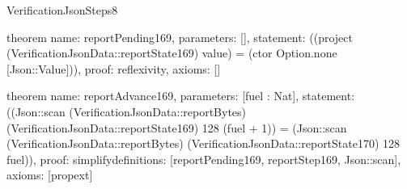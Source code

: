 \begin{lexlean}{VerificationJsonSteps8}
\begin{semanticmodule}
theorem{
  name: reportPending169,
  parameters: [],
  statement: ((project (VerificationJsonData::reportState169) value) = (ctor Option.none [Json::Value])),
  proof: reflexivity{},
  axioms: []
}

theorem{
  name: reportAdvance169,
  parameters: [fuel : Nat],
  statement: ((Json::scan (VerificationJsonData::reportBytes) (VerificationJsonData::reportState169) 128 (fuel + 1)) = (Json::scan (VerificationJsonData::reportBytes) (VerificationJsonData::reportState170) 128 fuel)),
  proof: simplify{definitions: [reportPending169, reportStep169, Json::scan]},
  axioms: [propext]
}

\end{semanticmodule}
\end{lexlean}
